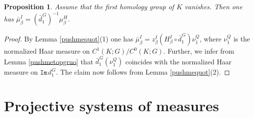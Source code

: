 \documentclass[11pt,reqno]{amsart}
\numberwithin{equation}{section}
\newtheorem{proposition}[theorem]{Proposition}
\theoremstyle{remark}
\theoremstyle{rmdefinition}
\begin{document}
\begin{proposition}\label{pusfintrept}
Assume that the first homology group of $K$ vanishes. Then one has 
$ \bar{\mu}^I_{\beta}= (\bar{d}_1^{\hspace{1pt}G})^{-1}\mu^H_{\beta}$.
\end{proposition}
\begin{proof}
By Lemma \ref{pushmequot}(1) one has 
$\bar{\mu}^I_{\beta}=z^I_{\beta}( H^I_{\beta}\circ \bar{d}_1^{\hspace{1pt}G})\nu^Q_1$, where $\nu^Q_1$ is the normalized Haar  measure on $C^1(K;G)/C^0(K;G)$. Further, we infer from Lemma \ref{pushmetopgruo} that $\bar{d}_1^{\hspace{1pt}G}(\nu^Q_1)$ coincides with the normalized Haar measure on $\mathtt{Im}\hspace{1pt}d_1^{\hspace{1pt}G}$. The claim now follows from Lemma \ref{pushmequot}(2).
\end{proof}
\section{Projective systems of measures}\label{projmlimmeasec}
\end{document}
